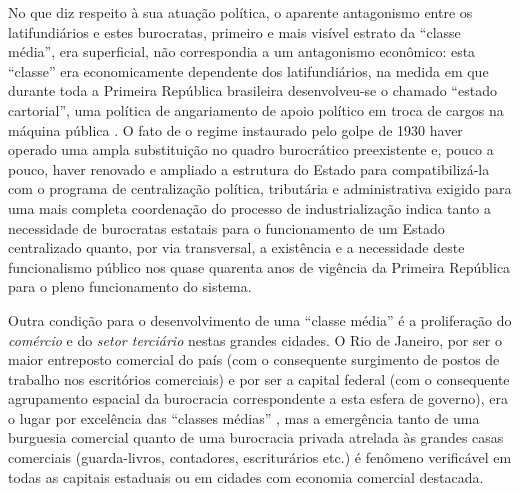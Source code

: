 No que diz respeito à sua atuação política, o aparente antagonismo entre os latifundiários e estes burocratas, primeiro e mais visível estrato da ``classe média'', era superficial, não correspondia a um antagonismo econômico: esta ``classe'' era economicamente dependente dos latifundiários, na medida em que durante toda a Primeira República brasileira desenvolveu-se o chamado ``estado cartorial'', uma política de angariamento de apoio político em troca de cargos na máquina pública \cite[p.~20]{pinheiro_clamed_1977}. O fato de o regime instaurado pelo golpe de 1930 haver operado uma ampla substituição no quadro burocrático preexistente e, pouco a pouco, haver renovado e ampliado a estrutura do Estado para compatibilizá-la com o programa de centralização política, tributária e administrativa exigido para uma mais completa coordenação do processo de industrialização \cite{araujo_dasp_2017} indica tanto a necessidade de burocratas estatais para o funcionamento de um Estado centralizado quanto, por via transversal, a existência e a necessidade deste funcionalismo público nos quase quarenta anos de vigência da Primeira República para o pleno funcionamento do sistema.

Outra condição para o desenvolvimento de uma ``classe média'' é a proliferação do \textit{comércio} e do \textit{setor terciário} nestas grandes cidades. O Rio de Janeiro, por ser o maior entreposto comercial do país (com o consequente surgimento de postos de trabalho nos escritórios comerciais) e por ser a capital federal (com o consequente agrupamento espacial da burocracia correspondente a esta esfera de governo), era o lugar por excelência das ``classes médias'' \cite[p.~119]{pinheiro_clamed_1977}, mas a emergência tanto de uma burguesia comercial quanto de uma burocracia privada atrelada às grandes casas comerciais (guarda-livros, contadores, escriturários etc.) é fenômeno verificável em todas as capitais estaduais ou em cidades com economia comercial destacada. 

